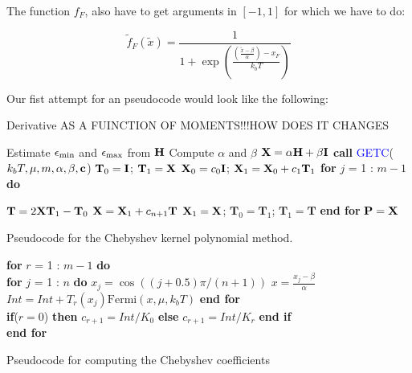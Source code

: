 The function $f_F$, also have to get arguments in $[-1,1]$ for which we have to do: 

\begin{equation}
  \tilde{f}_F(\tilde{x})= \frac{1}{1+\exp(\frac{(\frac{\tilde{x} - \beta}{\alpha})-x_F}{k_bT})}
  \label{Fermi}
\end{equation}

Our fist attempt for an pseudocode would look like the following: 

Derivative AS A FUINCTION OF MOMENTS!!!HOW DOES IT CHANGES 

\begin{algorithm}[H]
  \algrenewcommand{}
  \begin{algorithmic}
    \parskip 0.05cm
    {\fontsize{0.3cm}{0.3em}\selectfont 
      \State Estimate $\epsilon_{\mathrm{min}}$ and $\epsilon_{\mathrm{max}}$ from $\textbf{H}$
      \State Compute $\alpha$ and $\beta$      
      \State $\textbf{X} = \alpha\textbf{H} + \beta \textbf{I}$
      \State \textbf{call} \textcolor{blue}{GETC}($k_bT,\mu,m,\alpha,\beta,\textbf{c}$) 
      \State $\textbf{T}_0 = \textbf{I}$; $\textbf{T}_1 = \textbf{X}$
      \State $\textbf{X}_0 = c_0\textbf{I}$; $\textbf{X}_1 = \textbf{X}_0 + c_1\textbf{T}_1 $
      \State \textbf{for} $j$ = 1 : $m-1$ \textbf{do}
      
      \State \qquad \textcolor{red}{$\textbf{T} = 2\textbf{X}\textbf{T}_1 - \textbf{T}_{0}$}
      \State \qquad $\textbf{X} = \textbf{X}_1 + c_{n+1}\textbf{T}$
      \State \qquad $\textbf{X}_1 = \textbf{X}$; $\textbf{T}_{0} = \textbf{T}_{1}$; $\textbf{T}_{1} = \textbf{T}$  
      \State \textbf{end for}
      \State $\textbf{P} = \textbf{X}$
      \EndFunction
    }       
  \end{algorithmic}
  \label{pcode}
  \caption{Pseudocode for the Chebyshev kernel polynomial method.}
\end{algorithm}

\begin{algorithm}[H]
  \algrenewcommand{}
  \begin{algorithmic}
    \parskip 0.05cm
    {\fontsize{0.3cm}{0.3em}\selectfont 
      \State \textbf{for} $r$ = 1 : $m - 1$ \textbf{do}\\
      \State \qquad \textbf{for} $j$ = 1 : $n$ \textbf{do}        
      \State \qquad \qquad $x_j = \cos((j+0.5)\pi/(n + 1))$
      \State \qquad \qquad $x = \frac{x_j - \beta}{\alpha}$
      \State \qquad \qquad $Int = Int + T_r(x_j)\mathrm{Fermi}(x,\mu,k_bT)$            
      \State \qquad \textbf{end for}        \\
      \State \qquad \textbf{if}($r = 0$) \textbf{then}
      \State \qquad \qquad $c_{r+1} = Int/K_0$
      \State \qquad \textbf{else}      
      \State \qquad \qquad $c_{r+1} = Int/K_r$
      \State \qquad \textbf{end if}           \\ 
      \State \textbf{end for}
      \EndFunction
    }       
  \end{algorithmic}
  \label{pcode}
  \caption{Pseudocode for computing the Chebyshev coefficients}
\end{algorithm}

